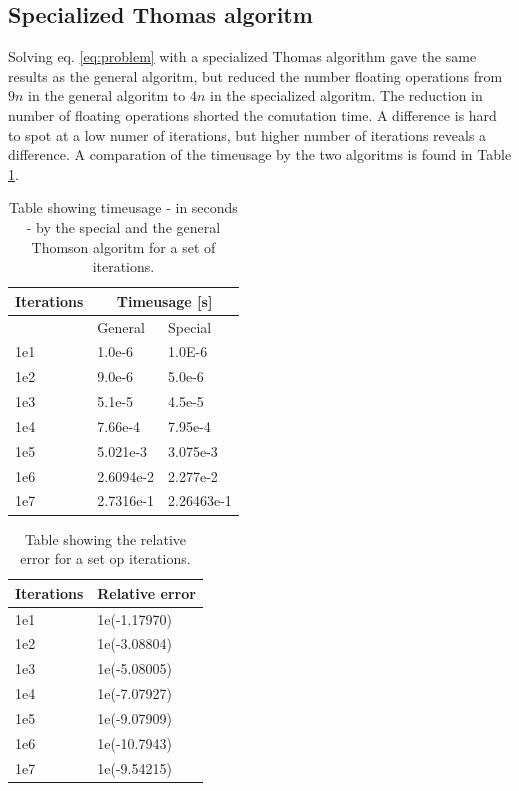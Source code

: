 \documentclass[twoside,twocolumn]{article}
\begin{document}
\subsection{Specialized Thomas algoritm}
Solving eq. \ref{eq:problem} with a specialized Thomas algorithm gave the same results as the general algoritm, but reduced the number floating operations from $9n$ in the general algoritm to $4n$ in the specialized algoritm. The reduction in number of floating operations shorted the comutation time. A difference is hard to spot at a low numer of iterations, but higher number of iterations reveals a difference. A comparation of the timeusage by the two algoritms is found in Table \ref{tbl:ThompsonTime}.
\begin{table}[htp]
\centering
\begin{tabular}{|l|l|l|} \hline
Iterations & \multicolumn{2}{|c|}{Timeusage [s]}\\ \hline
 	& General 	& Special\\ \hline
1e1	& 1.0e-6	& 1.0E-6\\
1e2 & 9.0e-6	& 5.0e-6\\
1e3 & 5.1e-5	& 4.5e-5\\
1e4 & 7.66e-4	& 7.95e-4\\
1e5 & 5.021e-3	& 3.075e-3\\
1e6 & 2.6094e-2	&2.277e-2\\
1e7 & 2.7316e-1	& 2.26463e-1 \\ \hline
\end{tabular}
\caption{Table showing timeusage - in seconds - by the special and the general Thomson algoritm for a set of iterations.} \label{tbl:ThompsonTime}
\end{table}



\begin{table}[htp]
\centering
\begin{tabular}{|l|l|} \hline
Iterations & Relative error\\ \hline
1e1 & 1e(-1.17970)\\
1e2 & 1e(-3.08804)\\
1e3 & 1e(-5.08005)\\
1e4 & 1e(-7.07927)\\
1e5 & 1e(-9.07909)\\
1e6 & 1e(-10.7943)\\
1e7 & 1e(-9.54215)\\ \hline
\end{tabular}
\caption{Table showing the relative error for a set op iterations.}
\end{table}

\twocolumn[{%
{}

}]
\end{document}
